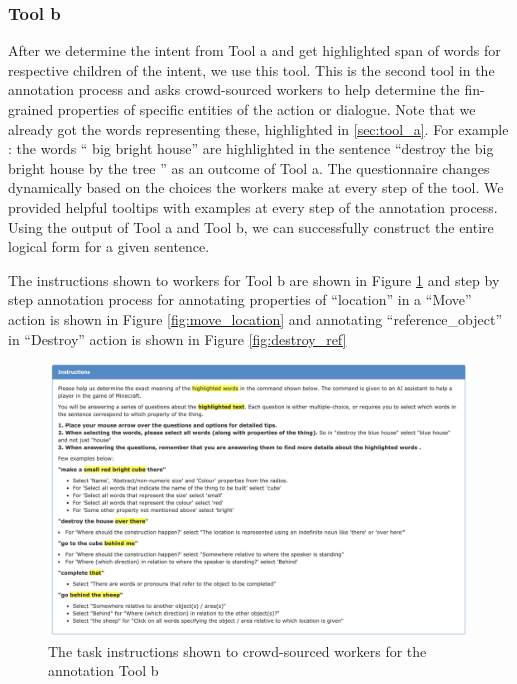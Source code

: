 \subsubsection{Tool b}
After we determine the intent from Tool a and get highlighted span of words for respective children of the intent, we use this tool.
This is the second tool in the annotation process and asks crowd-sourced workers to help determine the fin-grained properties of specific entities of the action or dialogue. Note that we already got the words representing these, highlighted in \ref{sec:tool_a}. For example : the words `` big bright house'' are highlighted in the sentence ``destroy the big bright house by the tree '' as an outcome of Tool a.
The questionnaire changes dynamically based on the choices the workers make at every step of the tool. We provided helpful tooltips with examples at every step of the annotation process.
Using the output of Tool a and Tool b, we can successfully construct the entire logical form for a given sentence.

The instructions shown to workers for Tool b are shown in Figure \ref{fig:annotation_task2} and step by step annotation process for annotating properties of ``location'' in a ``Move'' action is shown in Figure \ref{fig:move_location} and annotating ``reference\_object'' in ``Destroy'' action is shown in Figure \ref{fig:destroy_ref}
 

\label{sec:tool_b}

\begin{figure}
	\includegraphics[width=\linewidth ]{figures/21.png}
	\caption{The task instructions shown to crowd-sourced workers for the annotation Tool b}
	\label{fig:annotation_task2}
\end{figure}

